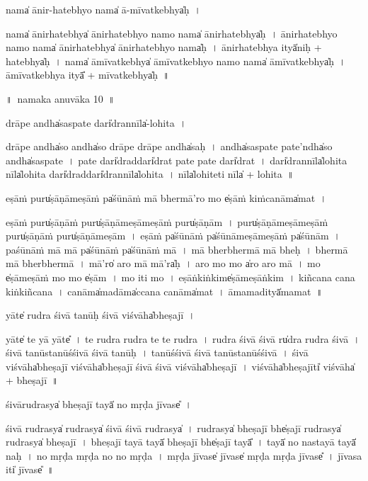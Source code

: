 \documentclass[parskip, DIV=14]{scrartcl}
\begin{document}
{nama̍ ānir-ha॒tebhyo॒ nama̍ ā-mīva॒tkebhya̍ḥ~।

nama̍ ānirha॒tebhya̍ ānirha॒tebhyo॒  namo॒ nama̍ ānirha॒tebhya̍ḥ~।
ā॒ni॒rha॒tebhyo॒ namo॒ nama̍ ānirha॒tebhya̍ ānirha॒tebhyo॒ nama̍ḥ~।
ā॒ni॒rha॒tebhya ityā̍niḥ + ha॒tebhya̍ḥ~।
nama̍ āmīva॒tkebhya̍ āmīva॒tkebhyo॒ namo॒ nama̍ āmīva॒tkebhya̍ḥ~।
ā॒mī॒va॒tkebhya॒ ityā̎ + mī॒va॒tkebhya̍ḥ~॥ 


\newpage
\LARGE
॥~namaka anuvāka 10~॥ 
\Large


drāpe॒ andha̍saspate॒ dari̍dra॒nnīla̍-lohita~।

drāpe॒ andha̍so॒ andha̍so॒ drāpe॒ drāpe॒ andha̍saḥ~।
andha̍saspate pa॒te'ndha̍so॒ andha̍saspate~।
pa॒te॒ dari̍dra॒ddari̍drat pate pate॒ dari̍drat~।
dari̍dra॒nnīla̍lohita॒ nīla̍lohita॒ dari̍dra॒ddari̍dra॒nnīla̍lohita~।
nīla̍lohi॒teti॒ nīla̍ + lo॒hi॒ta॒~॥ 


e॒ṣāṁ puru̍ṣāṇāme॒ṣāṁ pa̍śū॒nāṁ mā bhermā'ro॒ mo e̍ṣā॒ṁ kiṁca॒nāma̍mat~।

e॒ṣāṁ puru̍ṣāṇā॒ṁ puru̍ṣāṇāme॒ṣāme॒ṣāṁ  puru̍ṣāṇām~।
puru̍ṣāṇāme॒ṣāme॒ṣāṁ puru̍ṣāṇā॒ṁ puru̍ṣāṇāme॒ṣām~।
e॒ṣāṁ pa̍śū॒nāṁ pa̍śū॒nāme॒ṣāme॒ṣāṁ pa̍śū॒nām~।
pa॒śū॒nāṁ mā mā pa̍śū॒nāṁ pa̍śū॒nāṁ mā~।
mā bherbhermā mā bheḥ~।
bhermā mā bherbhermā~।
mā'ro̍ aro॒ mā mā'ra̍ḥ~।
a॒ro॒ mo mo a̍ro aro॒ mā~।
mo e̍ṣāmeṣā॒ṁ mo mo e̍ṣām~।
mo iti॒ mo~।
e॒ṣā॒ṅkiṅkime̍ṣāmeṣā॒ṅkim~।
ki॒ñca॒na ca॒na  kiṅkiñca॒na~।
ca॒nāma̍madāma̍cca॒na ca॒nāma̍mat~।
ā॒ma॒ma॒dityā̍mamat~॥ 
  
yāte̍ rudra śi॒vā ta॒nūḥ śi॒vā vi॒śvāha̍bheṣajī~।

yāte̍ te॒ yā yāte̎~।
te॒ ru॒dra॒ ru॒dra॒ te॒ te॒ ru॒dra॒~।
ru॒dra॒ śi॒vā śi॒vā ru̍dra rudra śi॒vā~।
śi॒vā ta॒nūsta॒nūśśi॒vā śi॒vā ta॒nūḥ~।
ta॒nūśśi॒vā śi॒vā  ta॒nūsta॒nūśśi॒vā~।
śi॒vā vi॒śvāha̍bheṣajī vi॒śvāha̍bheṣajī śi॒vā śi॒vā vi॒śvāha̍bheṣajī~।
vi॒śvāha̍bheṣa॒jīti̍ vi॒śvāha̍ + bhe॒ṣa॒jī॒~॥ 

śi॒vāru॒drasya̍ bheṣa॒jī tayā̍ no mṛḍa jī॒vase̎~।

śi॒vā ru॒drasya̍ ru॒drasya̍ śi॒vā śi॒vā ru॒drasya̍~।
ru॒drasya̍ bheṣa॒jī bhe̍ṣa॒jī ru॒drasya̍ ru॒drasya̍ bheṣa॒jī~।
bhe॒ṣa॒jī tayā॒ tayā̍ bheṣa॒jī bhe̍ṣa॒jī tayā̎~।
tayā̍ no na॒stayā॒ tayā̍ naḥ~।
no॒ mṛ॒ḍa॒ mṛ॒ḍa॒ no॒ no॒ mṛ॒ḍa॒~।
mṛ॒ḍa॒ jī॒vase̍ jī॒vase̍ mṛḍa mṛḍa jī॒vase̎~।
jī॒vasa॒ iti̍ jī॒vase̎~॥ 

}
\end{document}

